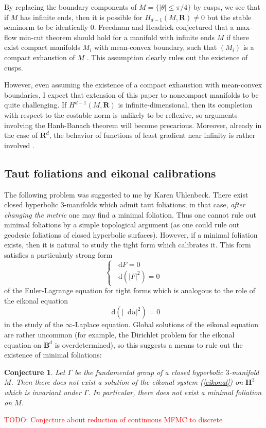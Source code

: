\documentclass[reqno,11pt]{amsart}
\newcommand{\RR}{\mathbf{R}}
\newcommand{\Hyp}{\mathbf H}
\newcommand{\Ball}{\mathbf{B}}
\newcommand*\dif{\mathop{}\!\mathrm{d}}
\newtheorem{conjecture}[theorem]{Conjecture}
\theoremstyle{definition}
\numberwithin{equation}{section}
\newcommand\todo[1]{\textcolor{red}{TODO: #1}}
\begin{document}
By replacing the boundary components of $M = \{|\theta| \leq \pi/4\}$ by cusps, we see that if $M$ has infinite ends, then it is possible for $H_{d - 1}(M, \RR) \neq 0$ but the stable seminorm to be identically $0$.
Freedman and Headrick conjectured that a max-flow min-cut theorem should hold for a manifold with infinite ends $M$ if there exist compact manifolds $M_i$ with mean-convex boundary, such that $(M_i)$ is a compact exhaustion of $M$ \cite[Appendix A]{Freedman_2016}.
This assumption clearly rules out the existence of cusps.

However, even assuming the existence of a compact exhaustion with mean-convex boundaries, I expect that extension of this paper to noncompact manifolds to be quite challenging.
If $H^{d - 1}(M, \RR)$ is infinite-dimensional, then its completion with respect to the costable norm is unlikely to be reflexive, so arguments involving the Hanh-Banach theorem will become precarious.
Moreover, already in the case of $\RR^d$, the behavior of functions of least gradient near infinity is rather involved \cite[\S4.4]{górny2021}.


\subsection{Taut foliations and eikonal calibrations}
The following problem was suggested to me by Karen Uhlenbeck. 
There exist closed hyperbolic $3$-manifolds which admit taut foliations; in that case, \emph{after changing the metric} one may find a minimal foliation.
Thus one cannot rule out minimal foliations by a simple topological argument (as one could rule out geodesic foliations of closed hyperbolic surfaces).
However, if a minimal foliation exists, then it is natural to study the tight form which calibrates it.
This form satisfies a particularly strong form 
\begin{equation}\label{eikonal}
\begin{cases}\dif F = 0 \\ \dif(|F|^2) = 0\end{cases}
\end{equation}
of the Euler-Lagrange equation for tight forms which is analogous to the role of the eikonal equation
$$\dif(|\dif u|^2) = 0$$
in the study of the $\infty$-Laplace equation.
Global solutions of the eikonal equation are rather uncommon (for example, the Dirichlet problem for the eikonal equation on $\Ball^d$ is overdetermined), so this suggests a means to rule out the existence of minimal foliations:

\begin{conjecture}\label{Karen}
Let $\Gamma$ be the fundamental group of a closed hyperbolic $3$-manifold $M$.
Then there does not exist a solution of the eikonal system (\ref{eikonal}) on $\Hyp^3$ which is invariant under $\Gamma$.
In particular, there does not exist a minimal foliation on $M$.
\end{conjecture}

\todo{Conjecture about reduction of continuous MFMC to discrete}




\printbibliography
\end{document}
